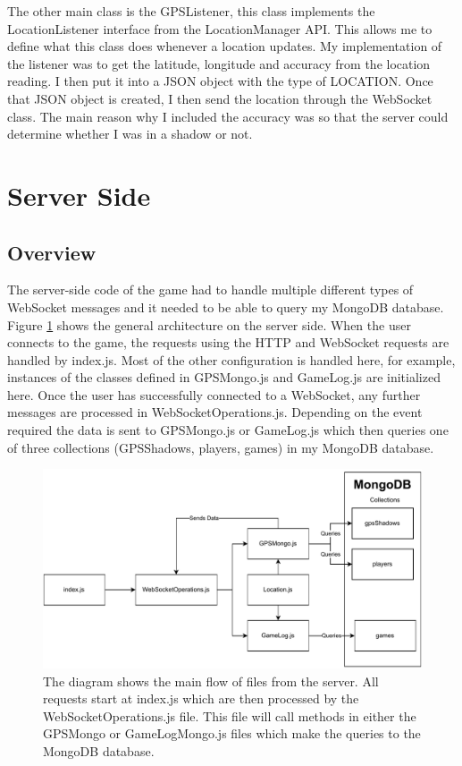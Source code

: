 \documentclass{l4proj}
\begin{document}
The other main class is the GPSListener, this class implements the LocationListener interface from the LocationManager
API. This allows me to define what this class does whenever a location updates. My implementation of the listener was
to get the latitude, longitude and accuracy from the location reading. I then put it into a JSON object with the type
of LOCATION. Once that JSON object is created, I then send the location through the WebSocket class. The main reason why
I included the accuracy was so that the server could determine whether I was in a shadow or not.


\section{Server Side}
\label{serverside_imp}

\subsection{Overview}
\label{serverOverview}
The server-side code of the game had to handle multiple different types of WebSocket messages and it needed
to be able to query my MongoDB database. Figure \ref{fig:serverSideOverview} shows the general architecture
on the server side. When the user connects to the game, the requests using the HTTP and WebSocket requests
are handled by index.js. Most of the other configuration is handled here, for example, instances of the classes
defined in GPSMongo.js and GameLog.js are initialized here. Once the user has successfully connected to a WebSocket,
any further messages are processed in WebSocketOperations.js. Depending on the event required the data is sent
to GPSMongo.js or GameLog.js which then queries one of three collections (GPSShadows, players, games) in my MongoDB database.

\begin{figure}
    \centering
    \includegraphics[width=\linewidth]{images/serverSideOverview.pdf}    

    \caption{
        The diagram shows the main flow of files from the server. All requests start at index.js which are
        then processed by the WebSocketOperations.js file. This file will call methods in either the GPSMongo
        or GameLogMongo.js files which make the queries to the MongoDB database.  
    }

    \label{fig:serverSideOverview} 
\end{figure}
\end{document}
